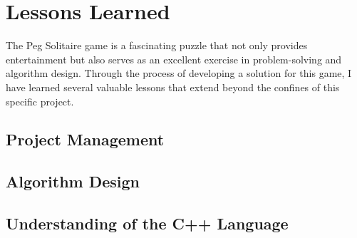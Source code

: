 \section{Lessons Learned}
\label{sec:lessons-learned}

The Peg Solitaire game is a fascinating puzzle that not only provides entertainment but also serves as an excellent exercise in problem-solving and algorithm design. Through the process of developing a solution for this game, I have learned several valuable lessons that extend beyond the confines of this specific project.

\subsection{Project Management}

\subsection{Algorithm Design}

\subsection{Understanding of the C++ Language}
